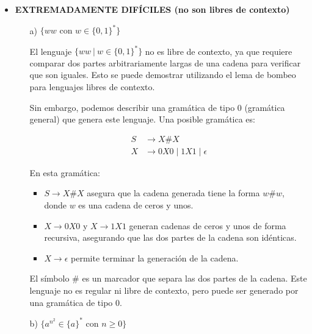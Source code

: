 \documentclass[12pt]{report} %
\begin{document}
\begin{ejercicio}
\begin{itemize}
\begin{itemize}
    \end{itemize}

    \item \textbf{EXTREMADAMENTE DIFÍCILES (no son libres de contexto)}
    \begin{itemize}
        \item[a)] $\{ww \text{ con } w \in \{0, 1\}^*\}$


        \begin{solucion}

        El lenguaje $\{ww \ | \ w \in \{0, 1\}^*\}$ no es libre de contexto, ya que requiere comparar dos partes arbitrariamente largas de una cadena para verificar que son iguales. Esto se puede demostrar utilizando el lema de bombeo para lenguajes libres de contexto.

        Sin embargo, podemos describir una gramática de tipo 0 (gramática general) que genera este lenguaje. Una posible gramática es:

        \begin{align*}
        S &\to X \# X \\
        X &\to 0X0 \mid 1X1 \mid \epsilon
        \end{align*}

        En esta gramática:
        \begin{itemize}
            \item $S \to X \# X$ asegura que la cadena generada tiene la forma $w \# w$, donde $w$ es una cadena de ceros y unos.
            \item $X \to 0X0$ y $X \to 1X1$ generan cadenas de ceros y unos de forma recursiva, asegurando que las dos partes de la cadena son idénticas.
            \item $X \to \epsilon$ permite terminar la generación de la cadena.
        \end{itemize}

        El símbolo $\#$ es un marcador que separa las dos partes de la cadena. Este lenguaje no es regular ni libre de contexto, pero puede ser generado por una gramática de tipo 0.

        \end{solucion}

        

        

        



        \item[b)] $\{a^{n^2} \in \{a\}^* \text{ con } n \geq 0\}$


\end{itemize}
\end{itemize}
\end{ejercicio}
\end{document}
